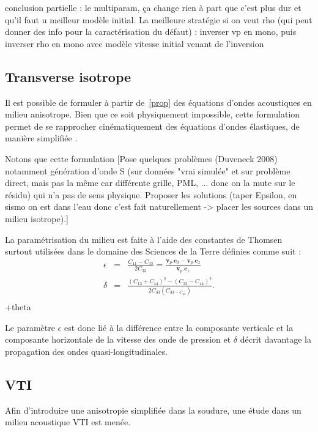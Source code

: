 conclusion partielle : le multiparam, ça change rien à part que c'est plus dur et qu'il faut u meilleur modèle initial. La meilleure stratégie si on veut rho (qui peut donner des info pour la caractérisation du défaut) : inverser vp en mono, puis inverser rho en mono avec modèle vitesse initial venant de l'inversion




\subsection{Transverse isotrope}

Il est possible de formuler à partir de~\ref{prop} des équations d'ondes acoustiques en milieu anisotrope. Bien que ce soit physiquement impossible, cette formulation permet de se rapprocher cinématiquement des équations d'ondes élastiques, de manière simplifiée \citep{alkhalifah}.

Notons que cette formulation [Pose quelques problèmes (Duveneck 2008) notamment génération d'onde S (sur données "vrai simulée"  et sur problème direct, mais pas la même car différente grille, PML, ... donc on la mute sur le résidu) qui n'a pas de sens physique. Proposer les solutions (taper Epsilon, en sismo on est dans l'eau donc c'est fait naturellement -> placer les sources dans un milieu isotrope).]
 

La paramétrisation du milieu est faite à l'aide des constantes de Thomsen~\citep{thomsen} surtout utilisées dans le domaine des Sciences de la Terre définies comme suit : 
\begin{eqnarray}
	\epsilon & =  & \frac{C_{11}-C_{33}}{2C_{33}} = \frac{\bm{v}_{p}.\bm{e}_{x} -  \bm{v}_{p}.\bm{e}_{z}}{\bm{v}_{p}.\bm{e}_{z}}\\
	\delta & = & \frac{(C_{13}+C_{44})^2-(C_{33}-C_{44})^2}{2C_{33}(C_{33-C_{44}})}\text{.}\\
\end{eqnarray}
+theta

Le paramètre $\epsilon$ est donc lié à la différence entre la composante verticale et la composante horizontale de la vitesse des onde de pression et $\delta$ décrit davantage la propagation des ondes quasi-longitudinales.






\subsection{VTI}
Afin d'introduire une anisotropie simplifiée dans la soudure, une étude dans un milieu acoustique VTI est menée.\\


